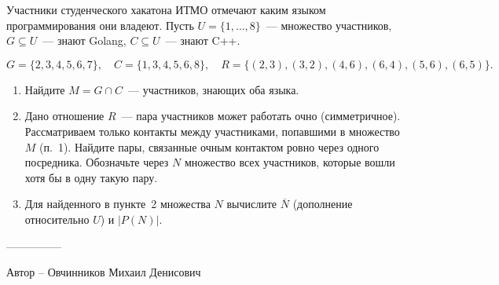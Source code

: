 \question
Участники студенческого хакатона ИТМО отмечают каким языком
программирования они владеют. Пусть $U = \{1, \ldots, 8\}$~---
множество участников, $G \subseteq U$~--- знают Golang,
$C \subseteq U$~--- знают C++.

\[
    G = \{2, 3, 4, 5, 6, 7\}, \quad
    C = \{1, 3, 4, 5, 6, 8\}, \quad
    R = \{(2, 3), (3, 2), (4, 6), (6, 4), (5, 6), (6, 5)\}.
\]

\begin{enumerate}
    \renewcommand{\labelenumi}{\arabic{enumi}.}
    \item Найдите $M = G \cap C$~--- участников, знающих оба языка.

    \item Дано отношение $R$~--- пара участников может работать очно
    (симметричное). Рассматриваем только контакты между участниками,
    попавшими в множество $M$ (п.~1). Найдите пары, связанные очным
    контактом ровно через одного посредника. Обозначьте через $N$
    множество всех участников, которые вошли хотя бы в одну такую пару.

    \item Для найденного в пункте~2 множества $N$ вычислите
    $\overline{N}$ (дополнение относительно $U$) и $|P(N)|$.
\end{enumerate}

---------------

Автор -- Овчинников Михаил Денисович
